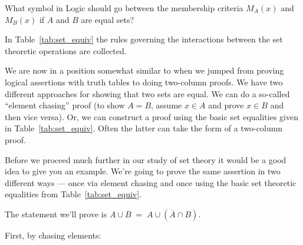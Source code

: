\begin{exer}
What symbol in Logic should go between the membership criteria
$M_A(x)$ and $M_B(x)$ if $A$ and $B$ are equal sets? 
\end{exer}

In Table~\ref{tab:set_equiv} the rules governing the interactions 
between the set theoretic operations are collected.
 
We are now in a position somewhat similar to when we jumped from
proving logical assertions with truth tables to doing two-column
proofs.  We have two different approaches for showing that two
sets are equal.  We can do a so-called ``element chasing'' proof
(to show $A=B$, assume $x \in A$ and prove $x \in B$ and then vice versa).
Or, we can construct a proof using the basic set equalities given
in Table~\ref{tab:set_equiv}.  Often the latter can take the form
of a two-column proof.



\clearpage

Before we proceed much further in our study of set theory it would be a
good idea to give you an example.  We're going to prove the same assertion
in two different ways --- once via element chasing and once using the 
basic set theoretic equalities from Table~\ref{tab:set_equiv}.

The statement we'll prove is $A \cup B \; = \; A \cup (\overline{A} \cap B)$.

First, by chasing elements:

